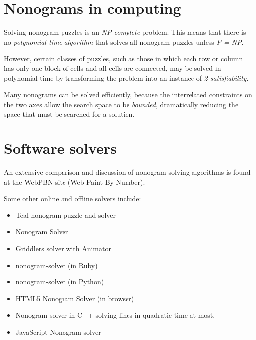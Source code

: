 \chapter{Nonograms in computing}
Solving nonogram puzzles is an \textit{NP-complete} problem.\cite{refer2}\cite{refer3}  This means that there is no \textit{polynomial time} \textit{algorithm} that solves all nonogram puzzles unless \textit{P = NP}.

However, certain classes of puzzles, such as those in which each row or column has only one block of cells and all cells are connected, may be solved in polynomial time by transforming the problem into an instance of \textit{2-satisfiability}.\cite{refer4}

Many nonograms can be solved efficiently, because the interrelated constraints on the two axes allow the search space to be \textit{bounded}, dramatically reducing the space that must be searched for a solution.


\chapter{Software solvers}

An extensive comparison and discussion of nonogram solving algorithms is found at the WebPBN site (Web Paint-By-Number).\cite{refer5}

Some other online and offline solvers include:


\begin{itemize} 
 \item {Teal nonogram puzzle and solver\cite{refer6}}

\item {Nonogram Solver\cite{refer7}}

\item {Griddlers solver with Animator\cite{refer8}}

\item {nonogram-solver (in Ruby)\cite{refer9}}

\item {nonogram-solver (in Python)\cite{refer10}}

\item {HTML5 Nonogram Solver (in browser)\cite{refer11}}

\item {Nonogram solver\cite{refer12} in C++ solving lines in quadratic time at most.\cite{refer13}}

\item {JavaScript Nonogram solver \cite{refer14}} 
\end{itemize}




